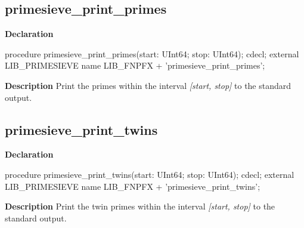 \documentclass{report}
\newif\ifpdf
\begin{document}
\subsection*{primesieve{\_}print{\_}primes}
\fi
\label{primesieve-primesieve_print_primes}
\begin{list}{}{
\setlength{\itemindent}{0cm}
\setlength{\listparindent}{0cm}
\setlength{\leftmargin}{\evensidemargin}
\addtolength{\leftmargin}{\tmplength}
\settowidth{\labelsep}{X}
\addtolength{\leftmargin}{\labelsep}
\setlength{\labelwidth}{\tmplength}
}
\item[\textbf{Declaration}\hfill]
\ifpdf
\begin{flushleft}
\fi
\begin{ttfamily}
procedure primesieve{\_}print{\_}primes(start: UInt64; stop: UInt64); cdecl; external LIB{\_}PRIMESIEVE name LIB{\_}FNPFX + 'primesieve{\_}print{\_}primes';\end{ttfamily}

\ifpdf
\end{flushleft}
\fi

\par
\item[\textbf{Description}]
Print the primes within the interval \textit{[start, stop]} to the standard output.

\end{list}
\ifpdf
\subsection*{\large{\textbf{primesieve{\_}print{\_}twins}}\normalsize\hspace{1ex}\hrulefill}
\else
\subsection*{primesieve{\_}print{\_}twins}
\fi
\label{primesieve-primesieve_print_twins}
\begin{list}{}{
\setlength{\itemindent}{0cm}
\setlength{\listparindent}{0cm}
\setlength{\leftmargin}{\evensidemargin}
\addtolength{\leftmargin}{\tmplength}
\settowidth{\labelsep}{X}
\addtolength{\leftmargin}{\labelsep}
\setlength{\labelwidth}{\tmplength}
}
\item[\textbf{Declaration}\hfill]
\ifpdf
\begin{flushleft}
\fi
\begin{ttfamily}
procedure primesieve{\_}print{\_}twins(start: UInt64; stop: UInt64); cdecl; external LIB{\_}PRIMESIEVE name LIB{\_}FNPFX + 'primesieve{\_}print{\_}twins';\end{ttfamily}

\ifpdf
\end{flushleft}
\fi

\par
\item[\textbf{Description}]
Print the twin primes within the interval \textit{[start, stop]} to the standard output.

\end{list}
\ifpdf
\end{document}
